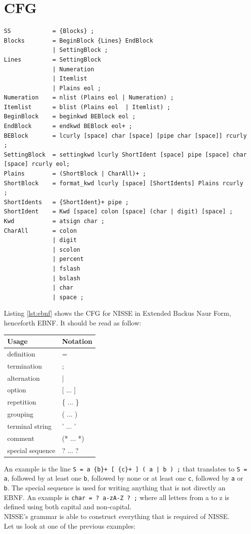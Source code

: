 \section{CFG}
\begin{lstlisting}[frame=single, caption={CFG of NISSE in EBNF.}, label={lst:ebnf}, language=NISSE]
SS            = {Blocks} ;
Blocks        = BeginBlock {Lines} EndBlock 
              | SettingBlock ;
Lines         = SettingBlock 
              | Numeration
              | Itemlist 
              | Plains eol ;
Numeration    = nlist (Plains eol | Numeration) ;
Itemlist      = blist (Plains eol  | Itemlist) ;
BeginBlock    = beginkwd BEBlock eol ;
EndBlock      = endkwd BEBlock eol+ ;
BEBlock       = lcurly [space] char [space] [pipe char [space]] rcurly ;
SettingBlock  = settingkwd lcurly ShortIdent [space] pipe [space] char [space] rcurly eol;
Plains        = (ShortBlock | CharAll)+ ;
ShortBlock    = format_kwd lcurly [space] [ShortIdents] Plains rcurly ;
ShortIdents   = {ShortIdent}+ pipe ;
ShortIdent    = Kwd [space] colon [space] (char | digit) [space] ;
Kwd           = atsign char ;
CharAll       = colon 
              | digit 
              | scolon 
              | percent 
              | fslash 
              | bslash 
              | char 
              | space ;
\end{lstlisting}
Listing \ref{lst:ebnf} shows the CFG for NISSE in Extended Backus Naur Form, henceforth EBNF. It should be read as follow:
\begin{center}
\begin{tabular}{|l|l|}
\hline 
Usage & Notation \\ 
\hline 
definition & = \\ 
\hline 
termination & ; \\ 
\hline 
alternation & | \\ 
\hline 
option & [ ... ] \\ 
\hline 
repetition & \{ ... \} \\ 
\hline 
grouping & ( ... ) \\ 
\hline 
terminal string & ' ... ' \\ 
\hline 
comment & (* ... *) \\ 
\hline 
special sequence & ? ... ? \\ 
\hline 
\end{tabular}
\end{center}
An example is the line \lstinline!S = a {b}+ [ {c}+ ] ( a | b ) ;! that translates to \lstinline!S = a!, followed by at least one \lstinline!b!, followed by none or at least one \lstinline!c!, followed by \lstinline!a! or \lstinline!b!. The special sequence is used for writing anything that is not directly an EBNF. An example is \lstinline!char = ? a-zA-Z ? ;! where all letters from a to z is defined using both capital and non-capital. \\
NISSE's grammar is able to construct everything that is required of NISSE. \\
Let us look at one of the previous examples:

